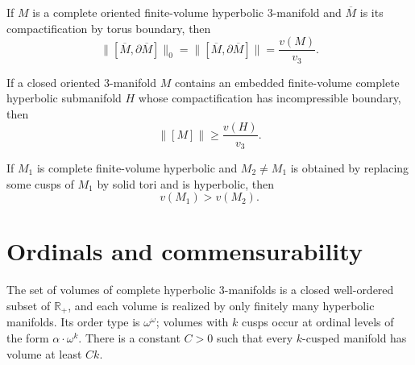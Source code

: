 \begin{theorem}
\label{thurston-ch06-relative-gromov-proportionality}

If $M$ is a complete oriented finite-volume hyperbolic $3$-manifold and $\overline M$ is its compactification by torus boundary, then
\[
\|[\overline M,\partial\overline M]\|_0
=\|[\overline M,\partial\overline M]\|
=\frac{v(M)}{v_3}.
\]
\end{theorem}

\begin{theorem}
\label{thurston-ch06-hyperbolic-submanifold-bound}

If a closed oriented $3$-manifold $M$ contains an embedded finite-volume complete hyperbolic submanifold $H$ whose compactification has incompressible boundary, then
\[
\|[M]\|\geq\frac{v(H)}{v_3}.
\]
\end{theorem}

\begin{theorem}
\label{thurston-ch06-cusp-filling-volume-decrease}

If $M_1$ is complete finite-volume hyperbolic and $M_2\neq M_1$ is obtained by replacing some cusps of $M_1$ by solid tori and is hyperbolic, then
\[
v(M_1)>v(M_2).
\]
\end{theorem}

\section{Ordinals and commensurability}

\begin{corollary}
\label{thurston-ch06-volume-well-order}

The set of volumes of complete hyperbolic $3$-manifolds is a closed well-ordered subset of $\mathbb R_+$, and each volume is realized by only finitely many hyperbolic manifolds. Its order type is $\omega^\omega$; volumes with $k$ cusps occur at ordinal levels of the form $\alpha\cdot\omega^k$. There is a constant $C>0$ such that every $k$-cusped manifold has volume at least $Ck$.
\end{corollary}

